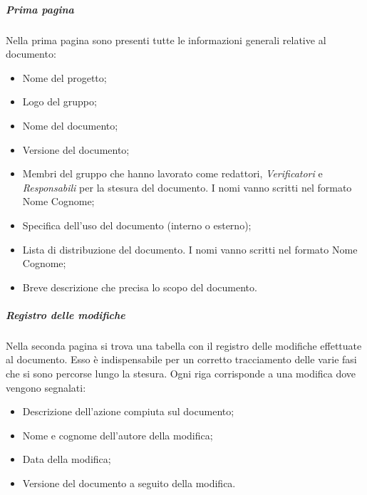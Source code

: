 \subparagraph{Prima pagina}
\label{sec:primaPagina}
Nella prima pagina sono presenti tutte le informazioni generali relative al documento:
\begin{itemize}
	\item Nome del progetto;
	\item Logo del gruppo;
	\item Nome del documento;
	\item Versione del documento;
	\item Membri del gruppo che hanno lavorato come redattori, \textit{Verificatori} e \textit{Responsabili} per la stesura del documento. I nomi vanno scritti nel formato Nome Cognome;
	\item Specifica dell'uso del documento (interno o esterno);
	\item Lista di distribuzione del documento. I nomi vanno scritti nel formato Nome Cognome;
	\item Breve descrizione che precisa lo scopo del documento.
\end{itemize}
\subparagraph{Registro delle modifiche}
Nella seconda pagina si trova una tabella con il registro delle modifiche effettuate al documento. Esso è indispensabile per un corretto tracciamento delle varie fasi che si sono percorse lungo la stesura. Ogni riga corrisponde a una modifica dove vengono segnalati:
\begin{itemize}
	\item Descrizione dell'azione compiuta sul documento;
	\item Nome e cognome dell'autore della modifica;
	\item Data della modifica;
	\item Versione del documento a seguito della modifica.
\end{itemize}

